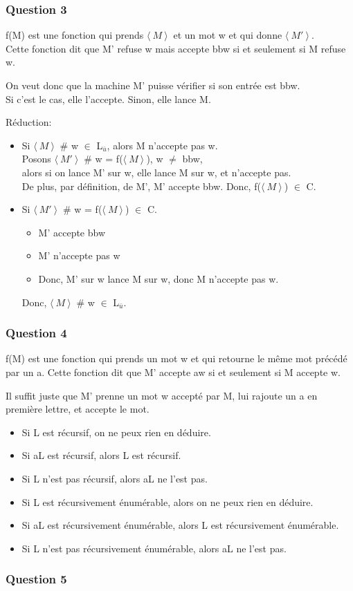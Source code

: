 \subsubsection{Question 3}

f(M) est une fonction qui prends $\langle\ M\ \rangle \!\ $ et un mot w et qui donne $\langle\ M'\ \rangle \!\ $.\\
Cette fonction dit que  M' refuse w mais accepte bbw si et seulement si M refuse w.

On veut donc que la machine M' puisse vérifier si son entrée est bbw.\\
Si c'est le cas, elle l'accepte. Sinon, elle lance M.

Réduction:
\begin{itemize}
  \item Si $\langle\ M\ \rangle \!\ $ \# w $\in$ L$_{\bar{u}}$, alors M n'accepte pas w.\\
  Posons $\langle\ M'\ \rangle \!\ $ \# w = f($\langle\ M\ \rangle \!\ $), w $\neq$ bbw,\\
  alors si on lance M' sur w, elle lance M sur w, et n'accepte pas.\\
  De plus, par définition, de M', M' accepte bbw. Donc, f($\langle\ M\ \rangle \!\ $) $\in$ C.
  \item Si $\langle\ M'\ \rangle \!\ $ \# w = f($\langle\ M\ \rangle \!\ $) $\in$ C.
  \begin{itemize}
    \item M' accepte bbw
    \item M' n'accepte pas w
    \item Donc, M' sur w lance M sur w, donc M n'accepte pas w.
  \end{itemize}
  Donc, $\langle\ M\ \rangle \!\ $ \# w $\in$ L$_{\bar{u}}$.
\end{itemize}


\subsubsection{Question 4}

f(M) est une fonction qui prends un mot w et qui retourne le même mot précédé par un a.
Cette fonction dit que M' accepte aw si et seulement si M accepte w.

Il suffit juste que M' prenne un mot w accepté par M, lui rajoute un a en première lettre, et accepte le mot.

\begin{itemize}
  \item Si L est récursif, on ne peux rien en déduire.
  \item Si aL est récursif, alors L est récursif.
  \item Si L n'est pas récursif, alors aL ne l'est pas.
  \item Si L est récursivement énumérable, alors on ne peux rien en déduire.
  \item Si aL est récursivement énumérable, alors L est récursivement énumérable.
  \item Si L n'est pas récursivement énumérable, alors aL ne l'est pas.
\end{itemize}

\subsubsection{Question 5}
